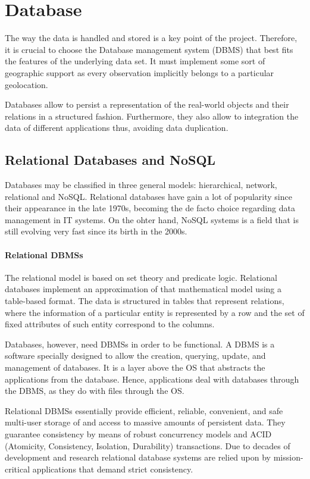 \section{Database}

The way the data is handled and stored is a key point of the project. Therefore, it is crucial to choose the Database management system (DBMS) that best fits the features of the underlying data set. It must implement some sort of geographic support as every observation implicitly belongs to a particular geolocation.

Databases allow to persist a representation of the real-world objects and their relations in a structured fashion. Furthermore, they also allow to integration the data of different applications thus, avoiding data duplication. 

\subsection{Relational Databases and NoSQL}

Databases may be classified in three general models: hierarchical, network, relational and NoSQL. Relational databases have gain a lot of popularity since their appearance in the late 1970s, becoming the de facto choice regarding data management in IT systems. On the ohter hand, NoSQL systems is a field that is still evolving very fast since its birth in the 2000s.

\paragraph{Relational DBMSs}

The relational model is based on set theory and predicate logic. Relational databases implement an approximation of that mathematical model using a table-based format. The data is structured in tables that represent relations, where the information of a particular entity is represented by a row and the set of fixed attributes of such entity correspond to the columns.

Databases, however, need DBMSs in order to be functional. A DBMS is a software specially designed to allow the creation, querying, update, and management of databases. It is a layer above the OS that abstracts the applications from the database. Hence, applications deal with databases through the DBMS, as they do with files through the OS.

Relational DBMSs essentially provide efficient, reliable, convenient, and safe multi-user storage of and access to massive amounts of persistent data. They guarantee consistency by means of robust concurrency models and ACID (Atomicity, Consistency, Isolation, Durability) transactions. Due to decades of development and research relational database systems are relied upon by mission-critical applications that demand strict consistency.

